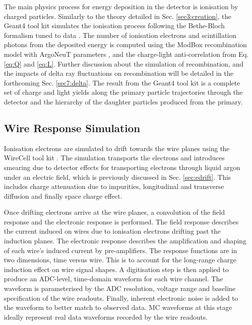The main physics process for energy deposition in the detector is ionisation by charged particles.
Similarly to the theory detailed in Sec. \ref{sec3:creation}, the Geant4 tool kit simulates the ionisation process following the Bethe-Bloch formalism tuned to data \cite{geant4_ions}.
The number of ionisation electrons and scintillation photons from the deposited energy is computed using the ModBox recombination model with ArgoNeuT parameters \cite{argoneut_recomb}, and the charge-light anti-correlation from Eq. \ref{eq:Q} and \ref{eq:L}. 
Further discussion about the simulation of recombination, and the impacts of delta ray fluctuations on recombination will be detailed in the forthcoming Sec. \ref{sec7:delta}.
The result from the Geant4 tool kit is a complete set of charge and light yields along the primary particle trajectories through the detector and the hierarchy of the daughter particles produced from the primary.

\subsection{Wire Response Simulation}
\label{sec:wire_response}

Ionisation electrons are simulated to drift towards the wire planes using the WireCell tool kit \cite{wirecell}.
The simulation transports the electrons and introduces smearing due to detector effects for transporting electrons through liquid argon under an electric field, which is previously discussed in Sec. \ref{sec:edrift}.
This includes charge attenuation due to impurities, longitudinal and transverse diffusion and finally space charge effect.

Once drifting electrons arrive at the wire planes, a convolution of the field response and the electronic response is performed.                                                                                                          
The field response describes the current induced on wires due to ionisation electrons drifting past the induction planes.                                                                                                           
The electronic response describes the amplification and shaping of each wire's induced current by pre-amplifiers.
The response functions are in two dimensions, time versus wire.
This is to account for the long-range charge induction effect on wire signal shapes.
A digitisation step is then applied to produce an ADC-level, time-domain waveform for each wire channel.
The waveform is parameterised by the ADC resolution, voltage range and baseline specification of the wire readouts.
Finally, inherent electronic noise is added to the waveform to better match to observed data.
MC waveforms at this stage ideally represent real data waveforms recorded by the wire readouts.

